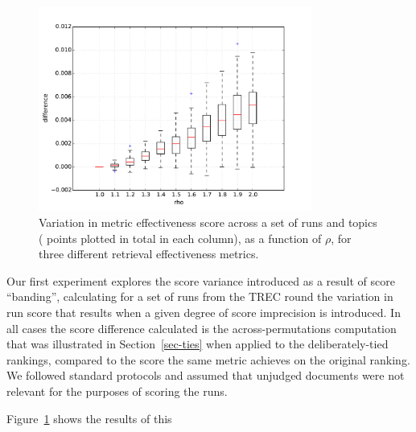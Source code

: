 \begin{figure}[t]
\centering
\includegraphics[width=0.8\textwidth]{figs/rho-score-variation.pdf}
\caption{Variation in metric effectiveness score across a set of
{} runs and {} topics ({} points plotted
in total in each column), as a function of $\rho$, for three
different retrieval effectiveness metrics.
{}
\label{fig-score-variation}}
\end{figure}

Our first experiment explores the score variance introduced as a
result of score ``banding'', calculating for a set of runs
from the {} TREC round the variation in run score
that results when a given degree of score imprecision is introduced.
In all cases the score difference calculated is the
across-permutations computation that was illustrated in
Section~\ref{sec-ties} when applied to the deliberately-tied
rankings, compared to the score the same metric achieves on the
original ranking.
We followed standard protocols and assumed that unjudged documents
were not relevant for the purposes of scoring the runs.

Figure~\ref{fig-score-variation} shows the results of this
{} 

